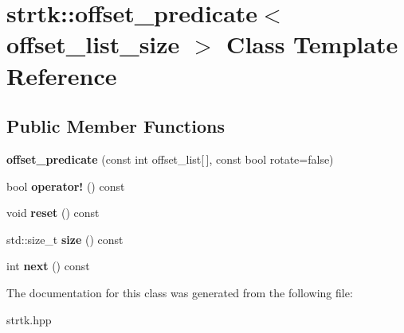 \hypertarget{classstrtk_1_1offset__predicate}{\section{strtk\-:\-:offset\-\_\-predicate$<$ offset\-\_\-list\-\_\-size $>$ Class Template Reference}
\label{classstrtk_1_1offset__predicate}
}
\subsection*{Public Member Functions}
\begin{DoxyCompactItemize}
\item 
\hypertarget{classstrtk_1_1offset__predicate_a499d79a514c39af19657300836101705}{{\bfseries offset\-\_\-predicate} (const int offset\-\_\-list\mbox{[}$\,$\mbox{]}, const bool rotate=false)}\label{classstrtk_1_1offset__predicate_a499d79a514c39af19657300836101705}

\item 
\hypertarget{classstrtk_1_1offset__predicate_a95b8809dcc388948368a7b72318978ee}{bool {\bfseries operator!} () const }\label{classstrtk_1_1offset__predicate_a95b8809dcc388948368a7b72318978ee}

\item 
\hypertarget{classstrtk_1_1offset__predicate_ae2a82c3ea8d1f4fae20dad7554feed75}{void {\bfseries reset} () const }\label{classstrtk_1_1offset__predicate_ae2a82c3ea8d1f4fae20dad7554feed75}

\item 
\hypertarget{classstrtk_1_1offset__predicate_ae3f3fd7bb1c7ab110c3205fb2bc4c94c}{std\-::size\-\_\-t {\bfseries size} () const }\label{classstrtk_1_1offset__predicate_ae3f3fd7bb1c7ab110c3205fb2bc4c94c}

\item 
\hypertarget{classstrtk_1_1offset__predicate_aab437175fa79bff4a3bfc360125537fa}{int {\bfseries next} () const }\label{classstrtk_1_1offset__predicate_aab437175fa79bff4a3bfc360125537fa}

\end{DoxyCompactItemize}


The documentation for this class was generated from the following file\-:\begin{DoxyCompactItemize}
\item 
strtk.\-hpp\end{DoxyCompactItemize}
